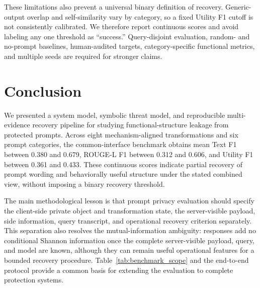 \documentclass[letterpaper]{article} %
\begin{document}
These limitations also prevent a universal binary definition of recovery.  Generic-output overlap and self-similarity vary by category, so a fixed Utility F1 cutoff is not consistently calibrated.  We therefore report continuous scores and avoid labeling any one threshold as ``success.''  Query-disjoint evaluation, random- and no-prompt baselines, human-audited targets, category-specific functional metrics, and multiple seeds are required for stronger claims.

\section{Conclusion}

We presented a system model, symbolic threat model, and reproducible multi-evidence recovery pipeline for studying functional-structure leakage from protected prompts.  Across eight mechanism-aligned transformations and six prompt categories, the common-interface benchmark obtains mean Text F1 between 0.380 and 0.679, ROUGE-L F1 between 0.312 and 0.606, and Utility F1 between 0.361 and 0.433.  These continuous scores indicate partial recovery of prompt wording and behaviorally useful structure under the stated combined view, without imposing a binary recovery threshold.

The main methodological lesson is that prompt privacy evaluation should specify the client-side private object and transformation state, the server-visible payload, side information, query transcript, and operational recovery criterion separately.  This separation also resolves the mutual-information ambiguity: responses add no conditional Shannon information once the complete server-visible payload, query, and model are known, although they can remain useful operational features for a bounded recovery procedure.  Table~\ref{tab:benchmark_scope} and the end-to-end protocol provide a common basis for extending the evaluation to complete protection systems.



\end{document}
